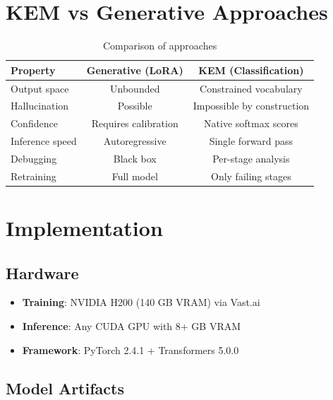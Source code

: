 \documentclass[11pt]{article}
\begin{document}
\section{KEM vs Generative Approaches}

\begin{table}[h]
\centering
\begin{tabular}{lcc}
\toprule
\textbf{Property} & \textbf{Generative (LoRA)} & \textbf{KEM (Classification)} \\
\midrule
Output space & Unbounded & Constrained vocabulary \\
Hallucination & Possible & Impossible by construction \\
Confidence & Requires calibration & Native softmax scores \\
Inference speed & Autoregressive & Single forward pass \\
Debugging & Black box & Per-stage analysis \\
Retraining & Full model & Only failing stages \\
\bottomrule
\end{tabular}
\caption{Comparison of approaches}
\end{table}

\section{Implementation}

\subsection{Hardware}

\begin{itemize}
    \item \textbf{Training}: NVIDIA H200 (140 GB VRAM) via Vast.ai
    \item \textbf{Inference}: Any CUDA GPU with 8+ GB VRAM
    \item \textbf{Framework}: PyTorch 2.4.1 + Transformers 5.0.0
\end{itemize}

\subsection{Model Artifacts}
\end{document}
